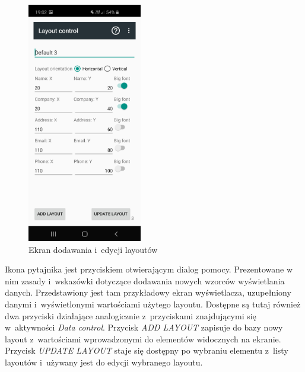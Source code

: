 \documentclass[a4paper,12pt, twoside]{article}
\begin{document}
\begin{enumerate}
    	   \begin{figure}[H]
    	        \centering
    	        \includegraphics[width=5cm]{images/view_layoutEdit.jpg}
    			\caption{ Ekran dodawania i~edycji layoutów}
                \label{fig:layoutControl}
    	   \end{figure}
    	   Ikona pytajnika jest przyciskiem otwierającym dialog pomocy. Prezentowane w nim zasady i~wskazówki dotyczące dodawania nowych wzorców wyświetlania danych. Przedstawiony jest tam przykładowy ekran wyświetlacza, uzupełniony danymi i~wyświetlonymi wartościami użytego layoutu.
    	   Dostępne są tutaj również dwa przyciski działające analogicznie z~przyciskami znajdującymi się w~aktywności \textit{Data control}. Przycisk \textit{ADD LAYOUT} zapisuje do bazy nowy layout z~wartościami wprowadzonymi do elementów widocznych na ekranie. Przycisk \textit{UPDATE LAYOUT} staje się dostępny po wybraniu elementu z~listy layoutów i~używany jest do edycji wybranego layoutu.
    	   

\end{enumerate}
\end{document}
